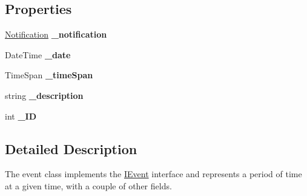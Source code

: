 \subsection*{Properties}
\begin{DoxyCompactItemize}
\item 
\hypertarget{class_calendar_system_1_1_model_1_1_event_a43e419d33262764a4147d4e082ebeeac}{\hyperlink{class_calendar_system_1_1_model_1_1_notification}{Notification} {\bfseries \+\_\+notification}}\label{class_calendar_system_1_1_model_1_1_event_a43e419d33262764a4147d4e082ebeeac}

\item 
\hypertarget{class_calendar_system_1_1_model_1_1_event_a0533000133f17a13cbd98878e2972417}{Date\+Time {\bfseries \+\_\+date}}\label{class_calendar_system_1_1_model_1_1_event_a0533000133f17a13cbd98878e2972417}

\item 
\hypertarget{class_calendar_system_1_1_model_1_1_event_a80a03074f9a64d1524a17580703f5b91}{Time\+Span {\bfseries \+\_\+time\+Span}}\label{class_calendar_system_1_1_model_1_1_event_a80a03074f9a64d1524a17580703f5b91}

\item 
\hypertarget{class_calendar_system_1_1_model_1_1_event_ada1696e6a1810b53342a0a8cc413a65b}{string {\bfseries \+\_\+description}}\label{class_calendar_system_1_1_model_1_1_event_ada1696e6a1810b53342a0a8cc413a65b}

\item 
\hypertarget{class_calendar_system_1_1_model_1_1_event_a7c5771b1fa4f3774ad2cff071dac03fe}{int {\bfseries \+\_\+\+I\+D}}\label{class_calendar_system_1_1_model_1_1_event_a7c5771b1fa4f3774ad2cff071dac03fe}

\end{DoxyCompactItemize}


\subsection{Detailed Description}
The event class implements the \hyperlink{interface_calendar_system_1_1_model_1_1_i_event}{I\+Event} interface and represents a period of time at a given time, with a couple of other fields. 



